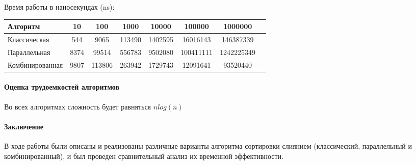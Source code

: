 \documentclass[utf8x, 12pt]{G7-32} %
\begin{document}
Время работы в наносекундах (ns):\\
\begin{tabular}{l*{6}{c}r}
	Алгоритм & 10 & 100 & 1000 & 10000 & 100000 & 1000000 \\
	\hline
	Классическая & 544 & 9065 & 113490 & 1402595 & 16016143 & 146387339 \\
	Параллельная & 8374 & 99514 & 556783 & 9502080 & 100411111 & 1242225349 \\
	Комбинированная & 9807 & 113806 & 263942 & 1729743 & 12091641 & 93520440 \\
\end{tabular}

\newpage

\paragraph{Оценка трудоемкостей алгоритмов}

Во всех алгоритмах сложность будет равняться $nlog(n)$

\paragraph{Заключение}

В ходе работы были описаны и реализованы различные варианты алгоритма сортировки слиянием (классический, параллельный и комбинированный), и был проведен сравнительный анализ их временной эффективности.

\backmatter %

\appendix   %
\end{document}
